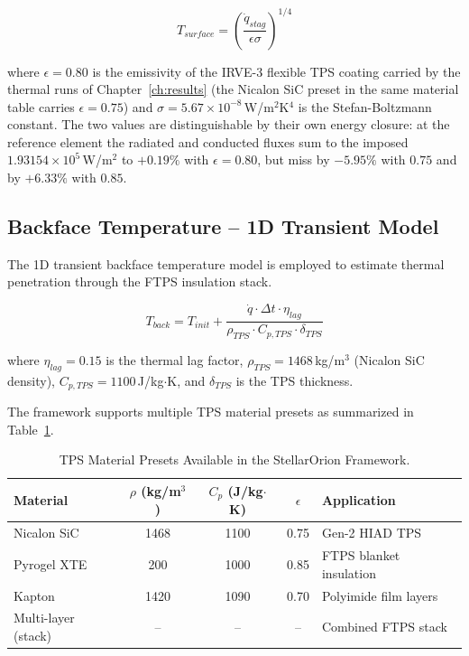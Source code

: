 \begin{equation}
    T_{surface} = \left(\frac{\dot{q}_{stag}}{\epsilon \sigma}\right)^{1/4}
\end{equation}

where $\epsilon = 0.80$ is the emissivity of the IRVE-3 flexible TPS coating carried by the thermal runs of Chapter~\ref{ch:results} (the Nicalon SiC preset in the same material table carries $\epsilon = 0.75$) and $\sigma = 5.67 \times 10^{-8}$\,W/m$^2$K$^4$ is the Stefan-Boltzmann constant. The two values are distinguishable by their own energy closure: at the reference element the radiated and conducted fluxes sum to the imposed $1.93154\times10^5$\,W/m$^2$ to $+0.19\%$ with $\epsilon = 0.80$, but miss by $-5.95\%$ with $0.75$ and by $+6.33\%$ with $0.85$.

\subsection{Backface Temperature -- 1D Transient Model}
The 1D transient backface temperature model is employed to estimate thermal penetration through the FTPS insulation stack.

\begin{equation}
    T_{back} = T_{init} + \frac{\dot{q} \cdot \Delta t \cdot \eta_{lag}}{\rho_{TPS} \cdot C_{p,TPS} \cdot \delta_{TPS}}
\end{equation}

where $\eta_{lag} = 0.15$ is the thermal lag factor, $\rho_{TPS} = 1468$\,kg/m$^3$ (Nicalon SiC density), $C_{p,TPS} = 1100$\,J/kg$\cdot$K, and $\delta_{TPS}$ is the TPS thickness.

The framework supports multiple TPS material presets as summarized in Table~\ref{tab:tps_materials}.

\begin{table}[H]
    \centering
    \caption{TPS Material Presets Available in the StellarOrion Framework.}
    \label{tab:tps_materials}
    \begin{tabularx}{\textwidth}{|l|c|c|c|>{\RaggedRight\arraybackslash}X|}
        \hline
        \textbf{Material} & \textbf{$\rho$ (kg/m$^3$)} & \textbf{$C_p$ (J/kg$\cdot$K)} & \textbf{$\epsilon$} & \textbf{Application} \\ \hline
        Nicalon SiC & 1468 & 1100 & 0.75 & Gen-2 HIAD TPS \\ \hline
        Pyrogel XTE & 200 & 1000 & 0.85 & FTPS blanket insulation \\ \hline
        Kapton & 1420 & 1090 & 0.70 & Polyimide film layers \\ \hline
        Multi-layer (stack) & -- & -- & -- & Combined FTPS stack \\ \hline
    \end{tabularx}
\end{table}

